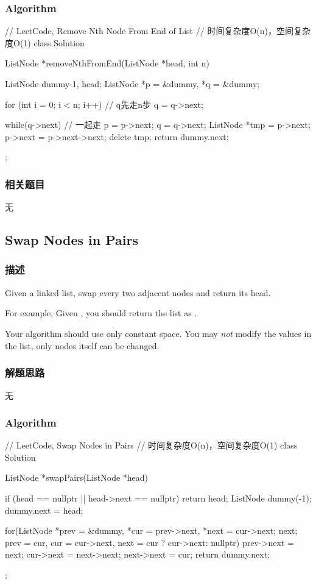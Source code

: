 \subsubsection{Algorithm}
\begin{Code}
	// LeetCode, Remove Nth Node From End of List
	// 时间复杂度O(n)，空间复杂度O(1)
	class Solution {
		ListNode *removeNthFromEnd(ListNode *head, int n) {
			ListNode dummy{-1, head};
			ListNode *p = &dummy, *q = &dummy;
			
			for (int i = 0; i < n; i++)  // q先走n步
				q = q->next;
			
			while(q->next) { // 一起走
				p = p->next;
				q = q->next;
			}
			ListNode *tmp = p->next;
			p->next = p->next->next;
			delete tmp;
			return dummy.next;
		}
	};
\end{Code}


\subsubsection{相关题目}

\begindot
\item 无
\myenddot


\subsection{Swap Nodes in Pairs}
\label{sec:swap-nodes-in-pairs}


\subsubsection{描述}
Given a linked list, swap every two adjacent nodes and return its head.

For example,
Given , you should return the list as .

Your algorithm should use only constant space. You may \emph{not} modify the 
values in the list, only nodes itself can be changed.


\subsubsection{解题思路}
无


\subsubsection{Algorithm}
\begin{Code}
	// LeetCode, Swap Nodes in Pairs
	// 时间复杂度O(n)，空间复杂度O(1)
	class Solution {
		ListNode *swapPairs(ListNode *head) {
			if (head == nullptr || head->next == nullptr) return head;
			ListNode dummy(-1);
			dummy.next = head;
			
			for(ListNode *prev = &dummy, *cur = prev->next, *next = cur->next; next;
				prev = cur, cur = cur->next, next = cur ? cur->next: nullptr) {
				prev->next = next;
				cur->next = next->next;
				next->next = cur;
			}
			return dummy.next;
		}
	};
\end{Code}

